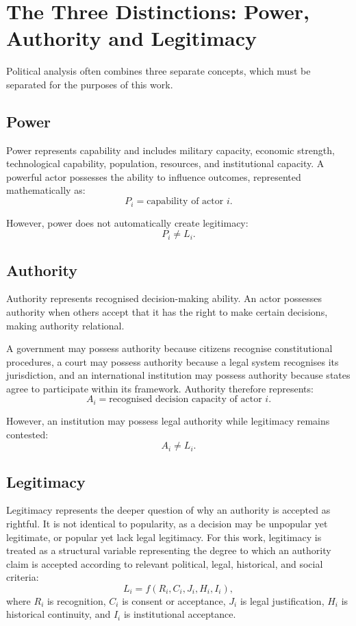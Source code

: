 \documentclass[11pt,openany]{book}
\theoremstyle{plain}
\theoremstyle{definition}
\begin{document}
\section*{The Three Distinctions: Power, Authority and Legitimacy}

Political analysis often combines three separate concepts, which must be separated for the purposes of this work.

\subsection*{Power}

Power represents capability and includes military capacity, economic strength, technological capability, population, resources, and institutional capacity. A powerful actor possesses the ability to influence outcomes, represented mathematically as:
\[
P_i = \text{capability of actor } i.
\]

However, power does not automatically create legitimacy:
\[
P_i \neq L_i.
\]

\subsection*{Authority}

Authority represents recognised decision-making ability. An actor possesses authority when others accept that it has the right to make certain decisions, making authority relational. 

A government may possess authority because citizens recognise constitutional procedures, a court may possess authority because a legal system recognises its jurisdiction, and an international institution may possess authority because states agree to participate within its framework. Authority therefore represents:
\[
A_i = \text{recognised decision capacity of actor } i.
\]

However, an institution may possess legal authority while legitimacy remains contested:
\[
A_i \neq L_i.
\]

\subsection*{Legitimacy}

Legitimacy represents the deeper question of why an authority is accepted as rightful. It is not identical to popularity, as a decision may be unpopular yet legitimate, or popular yet lack legal legitimacy. For this work, legitimacy is treated as a structural variable representing the degree to which an authority claim is accepted according to relevant political, legal, historical, and social criteria:
\[
L_i = f(R_i, C_i, J_i, H_i, I_i),
\]
where \(R_i\) is recognition, \(C_i\) is consent or acceptance, \(J_i\) is legal justification, \(H_i\) is historical continuity, and \(I_i\) is institutional acceptance. 
\end{document}
